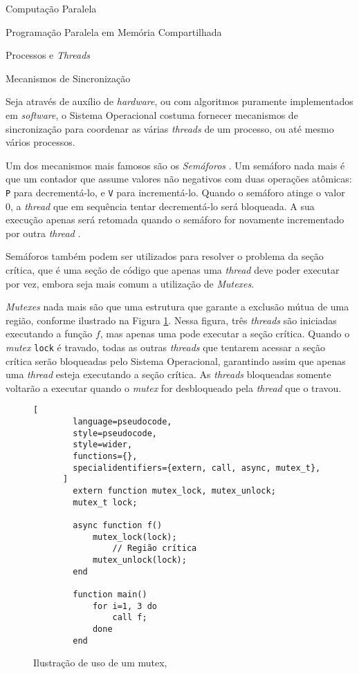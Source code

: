 \begin{section}{Computação Paralela}
\begin{subsection}{Programação Paralela em Memória Compartilhada}
\begin{subsubsection}{Processos e \textit{Threads}}
\end{subsubsection}

\begin{subsubsection}{Mecanismos de Sincronização}

	Seja através de auxílio de \textit{hardware}, ou com algoritmos
puramente implementados em \textit{software}, o Sistema Operacional
costuma fornecer mecanismos de sincronização para coordenar as várias
\textit{threads} de um processo, ou até mesmo vários processos.

    Um dos mecanismos mais famosos são os \textit{Semáforos}
\citep{dijkstra1965}.  Um semáforo nada mais é que um contador que assume
valores não negativos com duas operações atômicas: \texttt{P} para
decrementá-lo, e \texttt{V} para incrementá-lo. Quando o semáforo atinge o
valor 0, a \textit{thread} que em sequência tentar decrementá-lo será bloqueada. A
sua execução apenas será retomada quando o semáforo for novamente incrementado
por outra \textit{thread} \citep{semaphore}.

    Semáforos também podem ser utilizados para resolver o problema da
seção crítica, que é uma seção de código que apenas uma \textit{thread}
deve poder executar por vez, embora seja mais comum a utilização
de \textit{Mutexes}.

\textit{Mutexes} nada mais são que uma estrutura que garante a exclusão
mútua de uma região, conforme ilustrado na Figura \ref{fig:mutex}. Nessa
figura, três \textit{threads} são iniciadas executando a função $f$, mas
apenas uma pode executar a seção crítica.
    Quando o \textit{mutex} \texttt{lock} é travado,
todas as outras \textit{threads} que tentarem acessar a seção crítica
serão bloqueadas pelo Sistema Operacional, garantindo assim que apenas
uma \textit{thread} esteja executando a seção crítica.
As \textit{threads} bloqueadas somente voltarão a executar quando o
    \textit{mutex} for desbloqueado pela \textit{thread} que o travou.
\begin{figure}
      \begin{lstlisting}[
        language=pseudocode,
        style=pseudocode,
        style=wider,
        functions={},
        specialidentifiers={extern, call, async, mutex_t},
      ]
        extern function mutex_lock, mutex_unlock;
        mutex_t lock;

        async function f()
            mutex_lock(lock);
                // Região crítica
            mutex_unlock(lock);
        end

        function main()
            for i=1, 3 do
                call f;
            done
        end
      \end{lstlisting}
      \caption{Ilustração de uso de um mutex,}
      \label{fig:mutex}
\end{figure}


\end{subsubsection}
\end{subsection}
\end{section}
